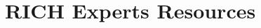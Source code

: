 \documentclass[12pt]{article}
\begin{document}
\fi


\newpage

\part{RICH Experts Resources}
%
\end{document}
